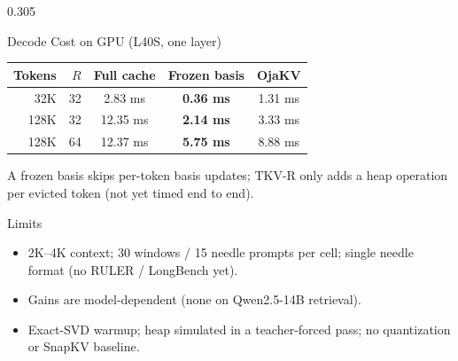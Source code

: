 \documentclass[final]{beamer}
\begin{document}
\begin{frame}[t]
\begin{columns}[t]
\begin{column}{0.305\paperwidth}
\begin{block}{Decode Cost on GPU (L40S, one layer)}
\begin{center}
\begin{tabular}{rrccc}
\toprule
Tokens & $R$ & Full cache & Frozen basis & OjaKV \\
\midrule
32K & 32 & 2.83 ms & \textbf{0.36 ms} & 1.31 ms \\
128K & 32 & 12.35 ms & \textbf{2.14 ms} & 3.33 ms \\
128K & 64 & 12.37 ms & \textbf{5.75 ms} & 8.88 ms \\
\bottomrule
\end{tabular}
\end{center}
\vspace{0.1cm}
A frozen basis skips per-token basis updates; TKV-R only adds a heap
operation per evicted token (not yet timed end to end).
\end{block}

\begin{block}{Limits}
\begin{itemize}
  \item 2K--4K context; 30 windows / 15 needle prompts per cell; single needle format (no RULER / LongBench yet).
  \item Gains are model-dependent (none on Qwen2.5-14B retrieval).
  \item Exact-SVD warmup; heap simulated in a teacher-forced pass; no quantization or SnapKV baseline.
\end{itemize}
\end{block}

\end{column}
\end{columns}

\end{frame}
\end{document}

